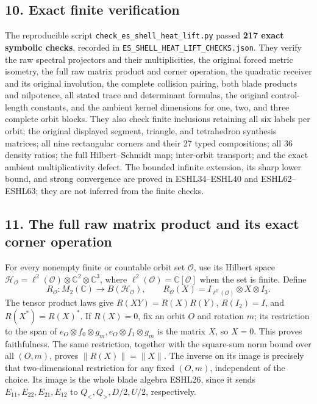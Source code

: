 \documentclass[
  10pt,
  a4paper,
]{article}
\begin{document}
\subsection{10. Exact finite
verification}\label{exact-finite-verification}

The reproducible script \texttt{check\_\allowbreak{}es\_\allowbreak{}shell\_\allowbreak{}heat\_\allowbreak{}lift.\allowbreak{}py} passed
\textbf{217 exact symbolic checks}, recorded in
\texttt{ES\_\allowbreak{}SHELL\_\allowbreak{}HEAT\_\allowbreak{}LIFT\_\allowbreak{}CHECKS.\allowbreak{}json}. They verify the raw
spectral projectors and their multiplicities, the original forced metric
isometry, the full raw matrix product and corner operation, the
quadratic receiver and its original involution, the complete collision
pairing, both blade products and nilpotence, all stated trace and
determinant formulas, the original control-length constants, and the
ambient kernel dimensions for one, two, and three complete orbit blocks.
They also check finite inclusions retaining all six labels per orbit;
the original displayed segment, triangle, and tetrahedron synthesis
matrices; all nine rectangular corners and their 27 typed compositions;
all 36 density ratios; the full Hilbert--Schmidt map; inter-orbit
transport; and the exact ambient multiplicativity defect. The bounded
infinite extension, its sharp lower bound, and strong convergence are
proved in ESHL34--ESHL40 and ESHL62--ESHL63; they are not inferred from
the finite checks.

\subsection{11. The full raw matrix product and its exact corner
operation}\label{the-full-raw-matrix-product-and-its-exact-corner-operation}

For every nonempty finite or countable orbit set \(\mathcal O\), use its
Hilbert space
\(\mathcal H_{\mathcal O}=\ell^2(\mathcal O)\otimes\mathbb C^2\otimes\mathbb C^3\),
where \(\ell^2(\mathcal O)=\mathbb C[\mathcal O]\) when the set is
finite. Define \[
R_{\mathcal O}:M_2(\mathbb C)\longrightarrow B(\mathcal H_{\mathcal O}),
\qquad R_{\mathcal O}(X)=I_{\ell^2(\mathcal O)}\otimes X\otimes I_3.
\tag{ESHL45}
\] The tensor product laws give \(R(XY)=R(X)R(Y)\), \(R(I_2)=I\), and
\(R(X^*)=R(X)^*\). If \(R(X)=0\), fix an orbit \(O\) and rotation \(m\);
its restriction to the span of
\(e_O\otimes f_0\otimes g_m,e_O\otimes f_1\otimes g_m\) is the matrix
\(X\), so \(X=0\). This proves faithfulness. The same restriction,
together with the square-sum norm bound over all \((O,m)\), proves
\(\|R(X)\|=\|X\|\). The inverse on its image is precisely that
two-dimensional restriction for any fixed \((O,m)\), independent of the
choice. Its image is the whole blade algebra ESHL26, since it sends
\(E_{11},E_{22},E_{21},E_{12}\) to \(Q_<,Q_>,D/2,U/2\), respectively.
\end{document}
